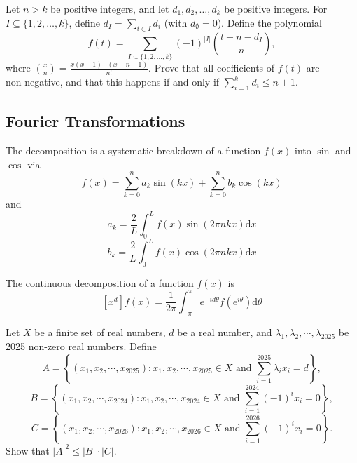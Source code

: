 \documentclass[11pt]{scrartcl}
\theoremstyle{plain} %
\theoremstyle{definition}
\theoremstyle{remark}
\theoremstyle{empty}
\theoremstyle{empty}
\theoremstyle{empty}
\theoremstyle{empty}
\theoremstyle{empty}
\theoremstyle{empty}
\theoremstyle{empty}
\begin{document}
\begin{problem}[2026 CTST P21]
  Let \( n > k \) be positive integers, and let \( d_1, d_2, \dots, d_k \) be positive integers. For \( I \subseteq \{1, 2, \dots, k\} \), define \( d_I = \sum_{i \in I} d_i \) (with \( d_\emptyset = 0 \)). Define the polynomial
\[
f(t) = \sum_{I \subseteq \{1, 2, \dots, k\}} (-1)^{|I|} \binom{t + n - d_I}{n},
\]where \( \binom{x}{n} = \frac{x(x-1)\cdots(x-n+1)}{n!} \). Prove that all coefficients of \( f(t) \) are non‑negative, and that this happens if and only if \( \sum_{i=1}^k d_i \le n+1 \).
\end{problem}

\begin{solution}

\end{solution}

\subsection{Fourier Transformations}

\begin{definition}
  The decomposition is a systematic breakdown of a function $f(x)$ into $\sin$ and $\cos$ via \[f(x) = \sum_{k=0}^n a_k \sin(k x) + \sum_{k=0}^n b_k \cos(kx)\] and \[a_k = \frac{2}{L} \int_0^L f(x) \sin(2\pi n k x) \mathrm dx\]\[b_k = \frac{2}{L} \int_0^L f(x) \cos(2\pi n kx) \mathrm dx\]
\end{definition}

\begin{definition}
The continuous decomposition of a function $f(x)$ is \[[x^d] f(x) = \frac{1}{2\pi}\int_{-\pi}^\pi e^{-id\theta} f(e^{i\theta}) \mathrm d\theta\]
\end{definition}

\begin{problem}[2025 CTST 15]
Let \( X \) be a finite set of real numbers, \( d \) be a real number, and \(\lambda_1, \lambda_2, \cdots, \lambda_{2025}\) be 2025 non-zero real numbers. Define
\[A = 
\left\{ 
(x_1, x_2, \cdots, x_{2025}) : x_1, x_2, \cdots, x_{2025} \in X \text{ and } \sum_{i=1}^{2025} \lambda_i x_i = d 
\right\},\]\[B = 
\left\{ 
(x_1, x_2, \cdots, x_{2024}) : x_1, x_2, \cdots, x_{2024} \in X \text{ and } \sum_{i=1}^{2024} (-1)^i x_i = 0 
\right\},\]\[C = 
\left\{ 
(x_1, x_2, \cdots, x_{2026}) : x_1, x_2, \cdots, x_{2026} \in X \text{ and } \sum_{i=1}^{2026} (-1)^i x_i = 0 
\right\}.\]Show that \( |A|^2 \leq |B| \cdot |C| \).
\end{problem}
\end{document}
